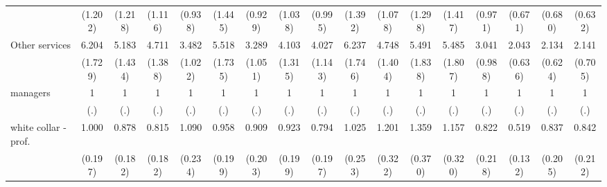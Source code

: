 {\begin{tabular}{l*{16}{c}}
                    &     (1.202)         &     (1.218)         &     (1.116)         &     (0.938)         &     (1.445)         &     (0.929)         &     (1.038)         &     (0.995)         &     (1.392)         &     (1.078)         &     (1.298)         &     (1.417)         &     (0.971)         &     (0.671)         &     (0.680)         &     (0.632)         \\
[1em]
Other services      &       6.204\sym{***}&       5.183\sym{***}&       4.711\sym{***}&       3.482\sym{***}&       5.518\sym{***}&       3.289\sym{***}&       4.103\sym{***}&       4.027\sym{***}&       6.237\sym{***}&       4.748\sym{***}&       5.491\sym{***}&       5.485\sym{***}&       3.041\sym{***}&       2.043\sym{*}  &       2.134\sym{**} &       2.141\sym{*}  \\
                    &     (1.729)         &     (1.434)         &     (1.388)         &     (1.022)         &     (1.735)         &     (1.051)         &     (1.315)         &     (1.143)         &     (1.746)         &     (1.404)         &     (1.838)         &     (1.807)         &     (0.988)         &     (0.636)         &     (0.624)         &     (0.705)         \\
[1em]
managers            &           1         &           1         &           1         &           1         &           1         &           1         &           1         &           1         &           1         &           1         &           1         &           1         &           1         &           1         &           1         &           1         \\
                    &         (.)         &         (.)         &         (.)         &         (.)         &         (.)         &         (.)         &         (.)         &         (.)         &         (.)         &         (.)         &         (.)         &         (.)         &         (.)         &         (.)         &         (.)         &         (.)         \\
[1em]
white collar - prof.&       1.000         &       0.878         &       0.815         &       1.090         &       0.958         &       0.909         &       0.923         &       0.794         &       1.025         &       1.201         &       1.359         &       1.157         &       0.822         &       0.519\sym{**} &       0.837         &       0.842         \\
                    &     (0.197)         &     (0.182)         &     (0.182)         &     (0.234)         &     (0.199)         &     (0.203)         &     (0.199)         &     (0.197)         &     (0.253)         &     (0.322)         &     (0.370)         &     (0.320)         &     (0.218)         &     (0.132)         &     (0.205)         &     (0.212)         \\

\end{tabular}}
